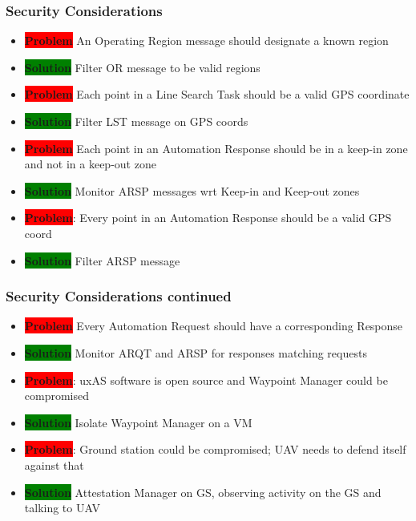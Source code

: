 \documentclass{beamer}
\begin{document}
\begin{frame}\frametitle{Security Considerations}

\begin{itemize}[<+->]
\item \colorbox{red}{\textbf{Problem}} An Operating Region message should designate a known region
\item \colorbox{green}{\textbf{Solution}} Filter OR message to be valid regions

\item \colorbox{red}{\textbf{Problem}} Each point in a Line Search Task should be a valid GPS coordinate
\item \colorbox{green}{\textbf{Solution}} Filter LST message on GPS coords

\item \colorbox{red}{\textbf{Problem}} Each point in an Automation Response should be
  in a keep-in zone and not in a keep-out zone
\item \colorbox{green}{\textbf{Solution}} Monitor ARSP messages wrt Keep-in and Keep-out zones

\item \colorbox{red}{\textbf{Problem}}: Every point in an Automation Response should be a valid GPS coord
\item \colorbox{green}{\textbf{Solution}} Filter ARSP message
\end{itemize}

\end{frame}

\begin{frame}\frametitle{Security Considerations continued}

\begin{itemize}[<+->]
\item \colorbox{red}{\textbf{Problem}} Every Automation Request should have a corresponding Response
\item \colorbox{green}{\textbf{Solution}} Monitor ARQT and ARSP for responses matching requests

\item \colorbox{red}{\textbf{Problem}}: uxAS software is open source and Waypoint Manager could be compromised
\item \colorbox{green}{\textbf{Solution}} Isolate Waypoint Manager on a VM

\item \colorbox{red}{\textbf{Problem}}: Ground station could be compromised; UAV needs to defend itself against that
\item \colorbox{green}{\textbf{Solution}} Attestation Manager on GS, observing activity
  on the GS and talking to UAV
\end{itemize}

\end{frame}
\end{document}
